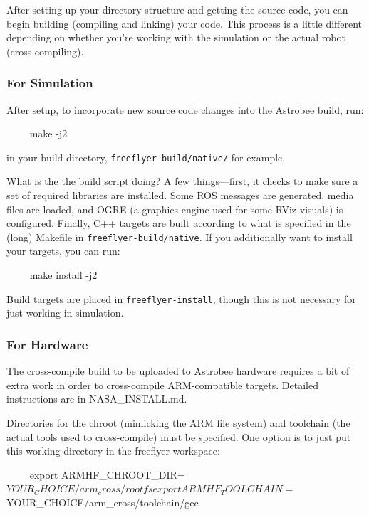 \documentclass{article}
\begin{document}
After setting up your directory structure and getting the source code, you can begin building (compiling and linking) your code. This process is a little different depending on whether you're working with the simulation or the actual robot (cross-compiling).

\subsubsection{For Simulation}
After setup, to incorporate new source code changes into the Astrobee build, run:
\begin{markdown}
~~~~
make -j2
~~~~
\end{markdown} 

\noindent{}in your build directory, \texttt{freeflyer-build/native/} for example.

What is the the build script doing? A few things---first, it checks to make sure a set of required libraries are installed. Some ROS messages are generated, media files are
loaded, and OGRE (a graphics engine used for some RViz visuals) is configured. Finally, C++ targets are built according to what is specified in the (long) Makefile in 
\texttt{freeflyer-build/native}. If you additionally want to install your targets, you can run:

\begin{markdown}
~~~~
make install -j2
~~~~
\end{markdown}

Build targets are placed in \texttt{freeflyer-install}, though this is not necessary for just working in simulation.

\subsubsection{For Hardware}

The cross-compile build to be uploaded to Astrobee hardware requires a bit of extra work in order to cross-compile ARM-compatible targets. Detailed instructions are in NASA\_INSTALL.md.

Directories for the chroot (mimicking the ARM file system) and toolchain (the actual tools used to cross-compile) must be specified. One option is to just put this working directory in the freeflyer workspace:

\begin{markdown}
~~~~
export ARMHF_CHROOT_DIR=$YOUR_CHOICE/arm_cross/rootfs
export ARMHF_TOOLCHAIN=$YOUR_CHOICE/arm_cross/toolchain/gcc
~~~~
\end{markdown}
\end{document}
